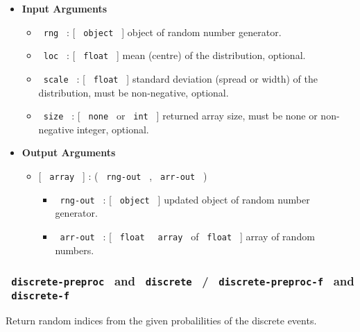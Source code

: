 \begin{itemize}
\item
  \textbf{Input Arguments}

  \begin{itemize}
  \tightlist
  \item
    \texttt{\ rng\ } : {[} \texttt{\ object\ } {]} object of random
    number generator.
  \item
    \texttt{\ loc\ } : {[} \texttt{\ float\ } {]} mean (centre) of the
    distribution, optional.
  \item
    \texttt{\ scale\ } : {[} \texttt{\ float\ } {]} standard deviation
    (spread or width) of the distribution, must be non-negative,
    optional.
  \item
    \texttt{\ size\ } : {[} \texttt{\ none\ } or \texttt{\ int\ } {]}
    returned array size, must be none or non-negative integer, optional.
  \end{itemize}
\item
  \textbf{Output Arguments}

  \begin{itemize}
  \tightlist
  \item
    {[} \texttt{\ array\ } {]} : ( \texttt{\ rng-out\ } ,
    \texttt{\ arr-out\ } )

    \begin{itemize}
    \tightlist
    \item
      \texttt{\ rng-out\ } : {[} \texttt{\ object\ } {]} updated object
      of random number generator.
    \item
      \texttt{\ arr-out\ } : {[} \texttt{\ float\ } \textbar{}
      \texttt{\ array\ } of \texttt{\ float\ } {]} array of random
      numbers.
    \end{itemize}
  \end{itemize}
\end{itemize}

\subsubsection{\texorpdfstring{\texttt{\ discrete-preproc\ } and
\texttt{\ discrete\ } / \texttt{\ discrete-preproc-f\ } and
\texttt{\ discrete-f\ }}{ discrete-preproc  and  discrete  /  discrete-preproc-f  and  discrete-f }}\label{discrete-preproc-and-discrete-discrete-preproc-f-and-discrete-f}

Return random indices from the given probalilities of the discrete
events.

\begin{Shaded}
\begin{Highlighting}[]
\end{Highlighting}
\end{Shaded}

